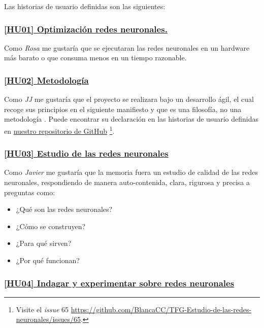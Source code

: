 Las historias de usuario definidas son las siguientes: 

\subsubsection*{\href{https://github.com/BlancaCC/TFG-Estudio-de-las-redes-neuronales/issues/48}{[HU01] Optimización redes neuronales.}
}\label{HU01}
    Como \textit{Rosa} me gustaría que se ejecutaran las redes neuronales en un hardware
    más barato o que consuma menos en un tiempo razonable.
 
\subsubsection*{ \href{https://github.com/BlancaCC/TFG-Estudio-de-las-redes-neuronales/issues/65}{[HU02] Metodología}
} \label{HUO2}

Como \textit{JJ} me gustaría que el proyecto se realizara bajo un desarrollo ágil,  el cual recoge sus principios en el siguiente manifiesto \cite{principios-manifiesto-agil} y que es una filosofía, no una metodología \cite{why-agile-is-not-a-methodology-1} \cite{why-agile-is-not-a-methodology-2}.
Puede encontrar su declaración en las historias de usuario definidas en \href{https://github.com/BlancaCC/TFG-Estudio-de-las-redes-neuronales}{nuestro repositorio 
de GitHub} \footnote{Visite el \textit{issue} 65 \url{https://github.com/BlancaCC/TFG-Estudio-de-las-redes-neuronales/issues/65}.}.
 

\subsubsection*{ 
    \href{https://github.com/BlancaCC/TFG-Estudio-de-las-redes-neuronales/issues/50}{
    [HU03] Estudio de las redes neuronales}
} \label{HUO3}
Como \textit{Javier} me gustaría que la memoria fuera un estudio de calidad de las redes neuronales, 
respondiendo de manera auto-contenida, clara, rigurosa y precisa a preguntas como:
\begin{itemize}
    \item ¿Qué son las redes neuronales?
    \item ¿Cómo se construyen?
    \item ¿Para qué sirven?
    \item ¿Por qué funcionan?
\end{itemize}


\subsubsection*{ 
\href{https://github.com/BlancaCC/TFG-Estudio-de-las-redes-neuronales/issues/51}{
    [HU04] Indagar y experimentar sobre redes neuronales}    
    } \label{HUO4}

